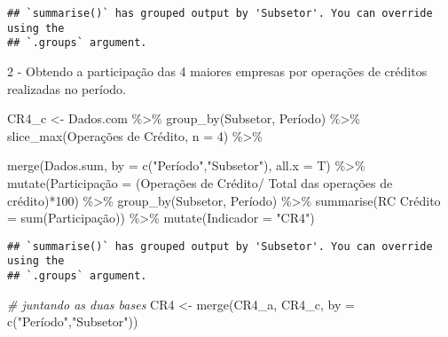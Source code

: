 \documentclass[
]{article}
\newenvironment{Shaded}{\begin{snugshade}}{\end{snugshade}}
\newcommand{\AttributeTok}[1]{\textcolor[rgb]{0.77,0.63,0.00}{#1}}
\newcommand{\CommentTok}[1]{\textcolor[rgb]{0.56,0.35,0.01}{\textit{#1}}}
\newcommand{\DecValTok}[1]{\textcolor[rgb]{0.00,0.00,0.81}{#1}}
\newcommand{\FunctionTok}[1]{\textcolor[rgb]{0.00,0.00,0.00}{#1}}
\newcommand{\NormalTok}[1]{#1}
\newcommand{\OtherTok}[1]{\textcolor[rgb]{0.56,0.35,0.01}{#1}}
\newcommand{\SpecialCharTok}[1]{\textcolor[rgb]{0.00,0.00,0.00}{#1}}
\newcommand{\StringTok}[1]{\textcolor[rgb]{0.31,0.60,0.02}{#1}}
\begin{document}
\begin{verbatim}
## `summarise()` has grouped output by 'Subsetor'. You can override using the
## `.groups` argument.
\end{verbatim}

2 - Obtendo a participação das 4 maiores empresas por operações de
créditos realizadas no período.

\begin{Shaded}
\begin{Highlighting}[]
\NormalTok{CR4\_c }\OtherTok{\textless{}{-}}\NormalTok{ Dados.com }\SpecialCharTok{\%\textgreater{}\%} 
  \FunctionTok{group\_by}\NormalTok{(Subsetor, Período) }\SpecialCharTok{\%\textgreater{}\%} 
  \FunctionTok{slice\_max}\NormalTok{(}\StringTok{\textasciigrave{}}\AttributeTok{Operações de Crédito}\StringTok{\textasciigrave{}}\NormalTok{, }\AttributeTok{n =} \DecValTok{4}\NormalTok{) }\SpecialCharTok{\%\textgreater{}\%}   
  
  \FunctionTok{merge}\NormalTok{(Dados.sum, }\AttributeTok{by =} \FunctionTok{c}\NormalTok{(}\StringTok{"Período"}\NormalTok{,}\StringTok{"Subsetor"}\NormalTok{), }\AttributeTok{all.x =}\NormalTok{ T) }\SpecialCharTok{\%\textgreater{}\%}
  \FunctionTok{mutate}\NormalTok{(Participação }\OtherTok{=}\NormalTok{ (}\StringTok{\textasciigrave{}}\AttributeTok{Operações de Crédito}\StringTok{\textasciigrave{}}\SpecialCharTok{/}
                         \StringTok{\textasciigrave{}}\AttributeTok{Total das operações de crédito}\StringTok{\textasciigrave{}}\NormalTok{)}\SpecialCharTok{*}\DecValTok{100}\NormalTok{) }\SpecialCharTok{\%\textgreater{}\%}
  \FunctionTok{group\_by}\NormalTok{(Subsetor, Período) }\SpecialCharTok{\%\textgreater{}\%}
  \FunctionTok{summarise}\NormalTok{(}\StringTok{\textasciigrave{}}\AttributeTok{RC Crédito}\StringTok{\textasciigrave{}} \OtherTok{=} \FunctionTok{sum}\NormalTok{(Participação)) }\SpecialCharTok{\%\textgreater{}\%} \FunctionTok{mutate}\NormalTok{(}\AttributeTok{Indicador =} \StringTok{"CR4"}\NormalTok{)}
\end{Highlighting}
\end{Shaded}

\begin{verbatim}
## `summarise()` has grouped output by 'Subsetor'. You can override using the
## `.groups` argument.
\end{verbatim}

\begin{Shaded}
\begin{Highlighting}[]
\CommentTok{\# juntando as duas bases}
\NormalTok{CR4 }\OtherTok{\textless{}{-}} \FunctionTok{merge}\NormalTok{(CR4\_a, CR4\_c, }\AttributeTok{by =} \FunctionTok{c}\NormalTok{(}\StringTok{"Período"}\NormalTok{,}\StringTok{"Subsetor"}\NormalTok{))}
\end{Highlighting}
\end{Shaded}
\end{document}
